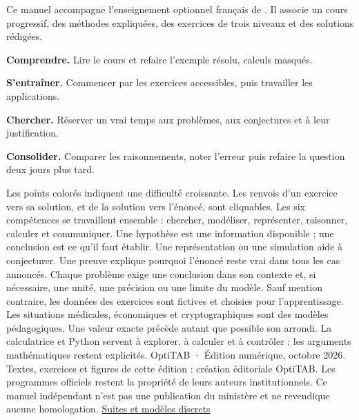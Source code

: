 \pagestyle{otFront}
Ce manuel accompagne l'enseignement optionnel français de \OptionLivre.
Il associe un cours progressif, des méthodes expliquées, des exercices de trois niveaux et des solutions rédigées.
\begin{savoirfaire}
\textbf{Comprendre.} Lire le cours et refaire l'exemple résolu, calculs masqués.\par
\textbf{S'entraîner.} Commencer par les exercices accessibles, puis travailler les applications.\par
\textbf{Chercher.} Réserver un vrai temps aux problèmes, aux conjectures et à leur justification.\par
\textbf{Consolider.} Comparer les raisonnements, noter l'erreur puis refaire la question deux jours plus tard.
\end{savoirfaire}
Les points colorés indiquent une difficulté croissante. Les renvois d'un exercice vers sa solution, et de la solution vers l'énoncé, sont cliquables.
Les six compétences se travaillent ensemble : chercher, modéliser, représenter, raisonner, calculer et communiquer.
Une hypothèse est une information disponible ; une conclusion est ce qu'il faut établir.
Une représentation ou une simulation aide à conjecturer. Une preuve explique pourquoi l'énoncé reste vrai dans tous les cas annoncés.
Chaque problème exige une conclusion dans son contexte et, si nécessaire, une unité, une précision ou une limite du modèle.
Sauf mention contraire, les données des exercices sont fictives et choisies pour l'apprentissage. Les situations médicales, économiques et cryptographiques sont des modèles pédagogiques.
Une valeur exacte précède autant que possible son arrondi. La calculatrice et Python servent à explorer, à calculer et à contrôler ; les arguments mathématiques restent explicités.
\vfill
{\small OptiTAB · Édition numérique, octobre 2026. Textes, exercices et figures de cette édition : création éditoriale OptiTAB. Les programmes officiels restent la propriété de leurs auteurs institutionnels. Ce manuel indépendant n'est pas une publication du ministère et ne revendique aucune homologation.}
\clearpage
{}
\noindent{}\hyperref[chap-1]{Suites et modèles discrets\otPoints\pageref*{chap-1}}\par\vspace{2.6mm}
